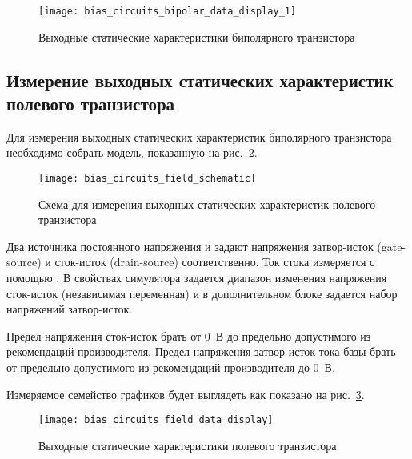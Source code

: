 \begin{figure}
    \centering
    \texttt{[image: bias\_circuits\_bipolar\_data\_display\_1]}
    \caption{Выходные статические характеристики биполярного транзистора}%
    \label{fig:bias_circuits_bipolar_data_display_1}
\end{figure}

\subsection{Измерение выходных статических характеристик полевого транзистора}

Для измерения выходных статических характеристик биполярного транзистора необходимо собрать модель, показанную на рис.~\ref{fig:bias_circuits_field_schematic}.

\begin{figure}
    \centering
    \texttt{[image: bias\_circuits\_field\_schematic]}
    \caption{Схема для измерения выходных статических характеристик полевого транзистора}%
    \label{fig:bias_circuits_field_schematic}
\end{figure}

Два источника постоянного напряжения  и  задают напряжения затвор-исток (gate-source) и сток-исток (drain-source) соответственно.
Ток стока измеряется с помощью . В свойствах симулятора  задается диапазон изменения напряжения сток-исток (независимая переменная) и в дополнительном блоке  задается набор напряжений затвор-исток.

Предел напряжения сток-исток брать от 0~В до предельно допустимого из рекомендаций производителя. Предел напряжения затвор-исток тока базы брать от предельно допустимого из рекомендаций производителя до 0~В.

Измеряемое семейство графиков будет выглядеть как показано на рис.~\ref{fig:bias_circuits_field_data_display}.

\begin{figure}
    \centering
    \texttt{[image: bias\_circuits\_field\_data\_display]}
    \caption{Выходные статические характеристики полевого транзистора}%
    \label{fig:bias_circuits_field_data_display}
\end{figure}
